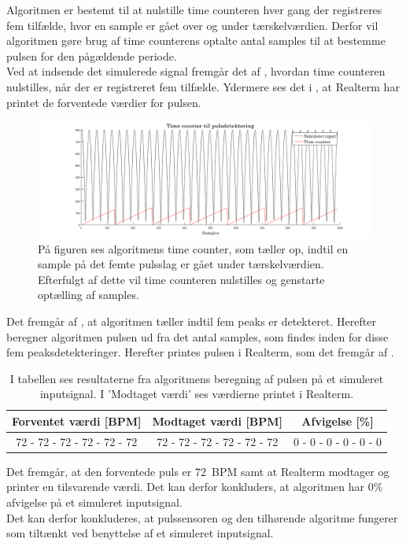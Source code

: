 Algoritmen er bestemt til at nulstille time counteren hver gang der registreres fem tilfælde, hvor en sample er gået over og under tærskelværdien. Derfor vil algoritmen gøre brug af time counterens optalte antal samples til at bestemme pulsen for den pågældende periode. \\
Ved at indsende det simulerede signal fremgår det af , hvordan time counteren nulstilles, når der er registreret fem tilfælde. Ydermere ses det i , at Realterm har printet de forventede værdier for pulsen.
\begin{figure}[H]
	\centering
	\includegraphics[scale=0.34]{figures/cDesign/timecounter_puls_pic.png}
	\caption{På figuren ses algoritmens time counter, som tæller op, indtil en sample på det femte pulsslag er gået under tærskelværdien. Efterfulgt af dette vil time counteren nulstilles og genstarte optælling af samples.}
	\label{fig:timecounter_puls_realterm}
\end{figure}\vspace{-.25cm}
Det fremgår af , at algoritmen tæller indtil fem peaks er detekteret. Herefter beregner algoritmen pulsen ud fra det antal samples, som findes inden for disse fem peaksdetekteringer. Herefter printes pulsen i Realterm, som det fremgår af .
\begin{table}[H]
	\centering
	\begin{tabular}{ccc}
		\hline
		\rowcolor[HTML]{C0C0C0} 
		Forventet værdi [BPM] & Modtaget værdi [BPM] & Afvigelse [\%]\\ \hline
		72 - 72 - 72 - 72 - 72 - 72         & 72 - 72 - 72 - 72 - 72 - 72         & 0 - 0 - 0 - 0 - 0 - 0 \\ \hline
	\end{tabular}
	\caption{I tabellen ses resultaterne fra algoritmens beregning af pulsen på et simuleret inputsignal. I 'Modtaget værdi' ses værdierne printet i Realterm.}
	\label{tab:test_puls_realterm}
\end{table} \vspace{-.25cm}
Det fremgår, at den forventede puls er 72~BPM samt at Realterm modtager og printer en tilsvarende værdi. Det kan derfor konkluders, at algoritmen har 0\% afvigelse på et simuleret inputsignal. \\
Det kan derfor konkluderes, at pulssensoren og den tilhørende algoritme fungerer som tiltænkt ved benyttelse af et simuleret inputsignal. 

